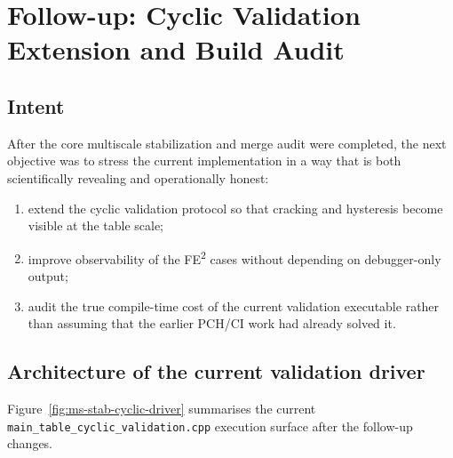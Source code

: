 \section{Follow-up: Cyclic Validation Extension and Build Audit}
\label{sec:ms-stab-cyclic-followup}

\subsection{Intent}

After the core multiscale stabilization and merge audit were completed, the
next objective was to stress the current implementation in a way that is both
scientifically revealing and operationally honest:
\begin{enumerate}
  \item extend the cyclic validation protocol so that cracking and hysteresis
    become visible at the table scale;
  \item improve observability of the FE\textsuperscript{2} cases without
    depending on debugger-only output;
  \item audit the true compile-time cost of the current validation executable
    rather than assuming that the earlier PCH/CI work had already solved it.
\end{enumerate}

\subsection{Architecture of the current validation driver}

Figure~\ref{fig:ms-stab-cyclic-driver} summarises the current
\texttt{main\_table\_cyclic\_validation.cpp} execution surface after the
follow-up changes.

